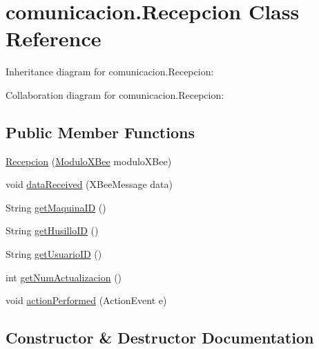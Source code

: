 \hypertarget{classcomunicacion_1_1_recepcion}{}\section{comunicacion.\+Recepcion Class Reference}
\label{classcomunicacion_1_1_recepcion}


Inheritance diagram for comunicacion.\+Recepcion\+:


Collaboration diagram for comunicacion.\+Recepcion\+:
\subsection*{Public Member Functions}
\begin{DoxyCompactItemize}
\item 
\mbox{\hyperlink{classcomunicacion_1_1_recepcion_a46155e495b5e0f637bb884bf8a0ac7a1}{Recepcion}} (\mbox{\hyperlink{classcomunicacion_1_1_modulo_x_bee}{Modulo\+X\+Bee}} modulo\+X\+Bee)
\item 
void \mbox{\hyperlink{classcomunicacion_1_1_recepcion_a83305dfbd31ca36b129c0cfb4e86a486}{data\+Received}} (X\+Bee\+Message data)
\item 
String \mbox{\hyperlink{classcomunicacion_1_1_recepcion_ab22533d01a1695958053c9898318f993}{get\+Maquina\+ID}} ()
\item 
String \mbox{\hyperlink{classcomunicacion_1_1_recepcion_a28eb0ee1c4a921ad9df8f893ba6809ed}{get\+Husillo\+ID}} ()
\item 
String \mbox{\hyperlink{classcomunicacion_1_1_recepcion_a8beb628d06ac82fdde1ee50157c93bc4}{get\+Usuario\+ID}} ()
\item 
int \mbox{\hyperlink{classcomunicacion_1_1_recepcion_afa39bd7c5b7b749cb28eb948ee130441}{get\+Num\+Actualizacion}} ()
\item 
void \mbox{\hyperlink{classcomunicacion_1_1_recepcion_a803e0127570a68b2135cbe33ad0fb739}{action\+Performed}} (Action\+Event e)
\end{DoxyCompactItemize}


\subsection{Constructor \& Destructor Documentation}
\mbox{\label{classcomunicacion_1_1_recepcion_a46155e495b5e0f637bb884bf8a0ac7a1}} 
